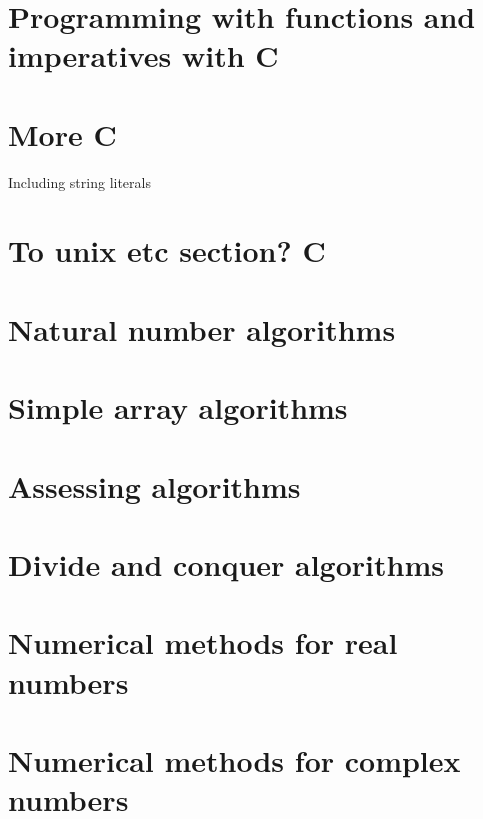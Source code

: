 \documentclass[oneside]{book}
\begin{document}
\part{Programming with functions and imperatives with C}








\part{More C}




Including string literals

\part{To unix etc section? C}



\part{Natural number algorithms}





\part{Simple array algorithms}






\part{Assessing algorithms}



\part{Divide and conquer algorithms}


\part{Numerical methods for real numbers}







\part{Numerical methods for complex numbers}

\end{document}
